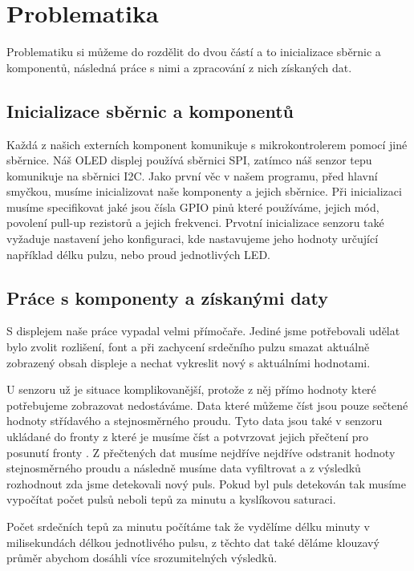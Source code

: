 \section{Problematika}
Problematiku si můžeme do rozdělit do dvou částí a to inicializace sběrnic a komponentů, následná práce s nimi a zpracování z nich získaných dat.

\subsection{Inicializace sběrnic a komponentů}
Každá z našich externích komponent komunikuje s mikrokontrolerem pomocí jiné sběrnice. Náš OLED displej používá sběrnici SPI, zatímco náš senzor tepu komunikuje na sběrnici I2C. Jako první věc v našem programu, před hlavní smyčkou, musíme inicializovat naše komponenty a jejich sběrnice. Při inicializaci musíme specifikovat jaké jsou čísla GPIO pinů které používáme, jejich mód, povolení pull-up rezistorů a jejich frekvenci. Prvotní inicializace senzoru také vyžaduje nastavení jeho konfiguraci, kde nastavujeme jeho hodnoty určující například délku pulzu, nebo proud jednotlivých LED.



\subsection{Práce s komponenty a získanými daty}
S displejem naše práce vypadal velmi přímočaře. Jediné jsme potřebovali udělat bylo zvolit rozlišení, font a při zachycení srdečního pulzu smazat aktuálně zobrazený obsah displeje a nechat vykreslit nový s aktuálními hodnotami.

U senzoru už je situace komplikovanější, protože z něj přímo hodnoty které potřebujeme zobrazovat nedostáváme. Data které můžeme číst jsou pouze sečtené hodnoty střídavého a stejnosměrného proudu. Tyto data jsou také v senzoru ukládané do fronty z které je musíme číst a potvrzovat jejich přečtení pro posunutí fronty \cite{max30102-datasheet}. Z přečtených dat musíme nejdříve nejdříve odstranit hodnoty stejnosměrného proudu a následně musíme data vyfiltrovat a z výsledků rozhodnout zda jsme detekovali nový puls. Pokud byl puls detekován tak musíme vypočítat počet pulsů neboli tepů za minutu a kyslíkovou saturaci. 

Počet srdečních tepů za minutu počítáme tak že vydělíme délku minuty v milisekundách délkou jednotlivého pulsu, z těchto dat také děláme klouzavý průměr abychom dosáhli více srozumitelných výsledků. 

